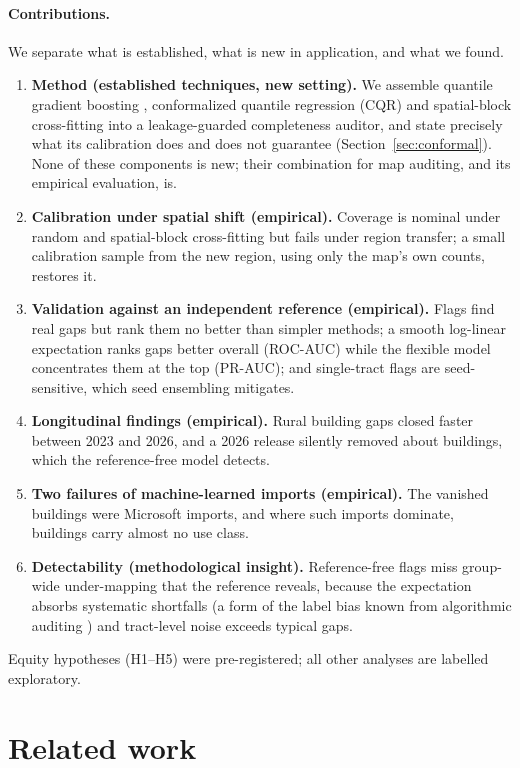 \documentclass[11pt]{article}
\begin{document}
\paragraph{Contributions.} We separate what is established, what is new in application, and what we found.
\begin{enumerate}
\item \textbf{Method (established techniques, new setting).} We assemble quantile gradient boosting \citep{ke2017}, conformalized quantile regression (CQR) \citep{romano2019} and spatial-block cross-fitting \citep{roberts2017} into a leakage-guarded completeness auditor, and state precisely what its calibration does and does not guarantee (Section~\ref{sec:conformal}). None of these components is new; their combination for map auditing, and its empirical evaluation, is.
\item \textbf{Calibration under spatial shift (empirical).} Coverage is nominal under random and spatial-block cross-fitting but fails under region transfer; a small calibration sample from the new region, using only the map's own counts, restores it.
\item \textbf{Validation against an independent reference (empirical).} Flags find real gaps but rank them no better than simpler methods; a smooth log-linear expectation ranks gaps better overall (ROC-AUC) while the flexible model concentrates them at the top (PR-AUC); and single-tract flags are seed-sensitive, which seed ensembling mitigates.
\item \textbf{Longitudinal findings (empirical).} Rural building gaps closed faster between 2023 and 2026, and a 2026 release silently removed about \EOneLost{} buildings, which the reference-free model detects.
\item \textbf{Two failures of machine-learned imports (empirical).} The vanished buildings were Microsoft imports, and where such imports dominate, buildings carry almost no use class.
\item \textbf{Detectability (methodological insight).} Reference-free flags miss group-wide under-mapping that the reference reveals, because the expectation absorbs systematic shortfalls (a form of the label bias known from algorithmic auditing \citep{obermeyer2019}) and tract-level noise exceeds typical gaps.
\end{enumerate}
Equity hypotheses (H1--H5) were pre-registered; all other analyses are labelled exploratory.

\section{Related work}
\end{document}
